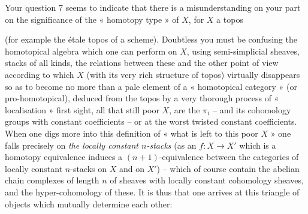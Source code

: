 \documentclass[11pt,a4paper]{article}
\begin{document}
Your question 7 seems to indicate that there is a misunderstanding on your part on the significance of the « homotopy type » of $X$, for $X$ a topos

(for example the étale topos of a scheme). Doubtless you must be confusing the homotopical algebra which one can perform on $X$, using semi-simplicial sheaves,  stacks of all kinds, the relations between these\add{,} and the other point of view according to which $X$ (with its very rich structure of topos) virtually disappears so as to become no more than a pale element of a « homotopical category » (or pro-homotopical), deduced from the topos by a very thorough process of « localisation »   first sight, all that still   poor  $X$, are the $\pi_i$ -- and its cohomology groups with constant coefficients -- or at the worst twisted constant coefficients. When one digs more into this definition of « what is left to this poor $X$ » one falls precisely on \emph{the locally constant $n$-stacks} (as an $f : X \to X'$ which is a homotopy equivalence induces a $(n+1)$-equivalence between the categories of locally constant $n$-stacks on $X$ and on $X'$) -- which of course contain the abelian chain complexes of length $n$ of sheaves with locally constant cohomology sheaves, and the hyper-cohomology of these. It is thus that one arrives at this triangle of objects which mutually determine each other:


\end{document}
